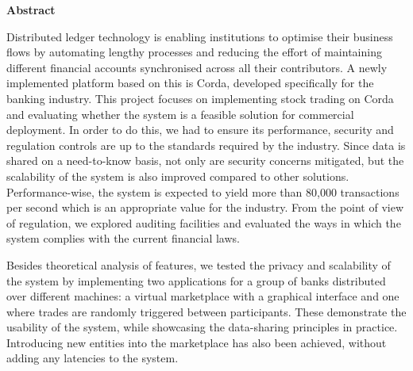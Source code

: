 \vspace*{2.5cm}
    \LARGE
    \textbf{Abstract}

\normalsize
 \vspace{3cm}

Distributed ledger technology is enabling institutions to optimise their business flows by automating lengthy processes and reducing the effort of maintaining different financial accounts synchronised across all their contributors. A newly implemented platform based on this is Corda, developed specifically for the banking industry. This project focuses on implementing stock trading on Corda and evaluating whether the system is a feasible solution for commercial deployment. In order to do this, we had to ensure its performance, security and regulation controls are up to the standards required by the industry. Since data is shared on a need-to-know basis, not only are security concerns mitigated, but the scalability of the system is also improved compared to other solutions. Performance-wise, the system is expected to yield more than 80,000 transactions per second which is an appropriate value for the industry. From the point of view of regulation, we explored auditing facilities and evaluated the ways in which the system complies with the current financial laws. 

\vspace{0.5cm}
Besides theoretical analysis of features, we tested the privacy and scalability of the system by implementing two applications for a group of banks distributed over different machines: a virtual marketplace with a graphical interface and one where trades are randomly triggered between participants. These demonstrate the usability of the system, while showcasing the data-sharing principles in practice. Introducing new entities into the marketplace has also been achieved, without adding any latencies to the system. 